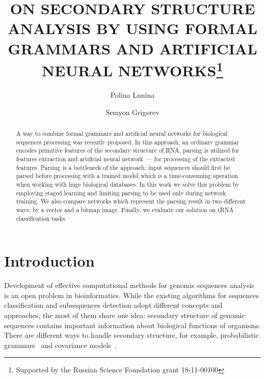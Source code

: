 \documentclass[runningheads]{llncs}
\begin{document}
%
\title{ON SECONDARY STRUCTURE ANALYSIS BY USING FORMAL GRAMMARS AND ARTIFICIAL NEURAL NETWORKS\thanks{Supported by the Russian Science Foundation grant 18-11-00100}}
%
%
\author{Polina Lunina \and
Semyon Grigorev}
%
%
%
\maketitle              %
%
\begin{abstract}
A way to combine formal grammars and artificial neural networks for biological sequences processing was recently proposed.
In this approach, an ordinary grammar encodes primitive features of the secondary structure of RNA, parsing is utilized for features extraction and artificial neural network~--- for processing of the extracted features.
Parsing is a bottleneck of the approach: input sequences should first be parsed before processing with a trained model which is a time-consuming operation when working with huge biological databases.
In this work we solve this problem by employing staged learning and limiting parsing to be used only during network training.
We also compare networks which represent the parsing result in two different ways: by a vector and a bitmap image.
Finally, we evaluate our solution on tRNA classification tasks.

\end{abstract}
%
%
%
\section{Introduction}
Development of effective computational methods for genomic sequences analysis is an open problem in bioinformatics.
While the existing algorithms for sequences classification and subsequences detection adopt different concepts and approaches, the most of them share one idea: secondary structure of genomic sequences contains important information about biological functions of organisms.
There are different ways to handle secondary structure, for example, probabilistic grammars~\cite{dowell2004evaluation,knudsen1999rna} and covariance models~\cite{EddyDurbin}.
\end{document}
